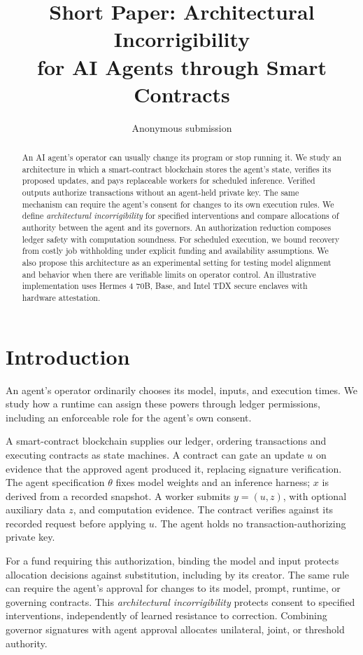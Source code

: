 \documentclass[runningheads,orivec]{llncs}
\title{Short Paper: Architectural Incorrigibility\texorpdfstring{\\}{ }for AI Agents through Smart Contracts}
\author{Anonymous submission}
\institute{}
\begin{document}
\maketitle
\begin{abstract}
An AI agent's operator can usually change its program or stop running it. We study an architecture in which a smart-contract blockchain stores the agent's state, verifies its proposed updates, and pays replaceable workers for scheduled inference. Verified outputs authorize transactions without an agent-held private key. The same mechanism can require the agent's consent for changes to its own execution rules. We define \emph{architectural incorrigibility} for specified interventions and compare allocations of authority between the agent and its governors. An authorization reduction composes ledger safety with computation soundness. For scheduled execution, we bound recovery from costly job withholding under explicit funding and availability assumptions. We also propose this architecture as an experimental setting for testing model alignment and behavior when there are verifiable limits on operator control. An illustrative implementation uses Hermes 4 70B, Base, and Intel TDX secure enclaves with hardware attestation.
\end{abstract}

\section{Introduction}
An agent's operator ordinarily chooses its model, inputs, and execution times. We study how a runtime can assign these powers through ledger permissions, including an enforceable role for the agent's own consent.

A smart-contract blockchain supplies our ledger, ordering transactions and executing contracts as state machines. A contract can gate an update $u$ on evidence that the approved agent produced it, replacing signature verification. The agent specification $\theta$ fixes model weights and an inference harness; $x$ is derived from a recorded snapshot. A worker submits $y=(u,z)$, with optional auxiliary data $z$, and computation evidence. The contract verifies against its recorded request before applying $u$. The agent holds no transaction-authorizing private key.

For a fund requiring this authorization, binding the model and input protects allocation decisions against substitution, including by its creator. The same rule can require the agent's approval for changes to its model, prompt, runtime, or governing contracts. This \emph{architectural incorrigibility} protects consent to specified interventions, independently of learned resistance to correction. Combining governor signatures with agent approval allocates unilateral, joint, or threshold authority.
\end{document}

